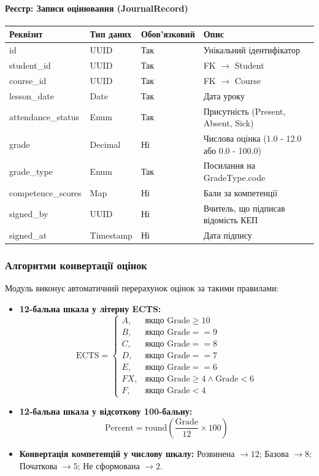 \documentclass{article}
\begin{document}
\paragraph{Реєстр: Записи оцінювання (JournalRecord)}
\begin{longtable}{p{3.5cm}p{3cm}p{2cm}p{5.5cm}}
\toprule
\textbf{Реквізит} & \textbf{Тип даних} & \textbf{Обов'язковий} & \textbf{Опис} \\
\midrule
id & UUID & Так & Унікальний ідентифікатор \\
student\_id & UUID & Так & FK $\rightarrow$ Student \\
course\_id & UUID & Так & FK $\rightarrow$ Course \\
lesson\_date & Date & Так & Дата уроку \\
attendance\_status & Enum & Так & Присутність (Present, Absent, Sick) \\
grade & Decimal & Ні & Числова оцінка (1.0 - 12.0 або 0.0 - 100.0) \\
grade\_type & Enum & Так & Посилання на GradeType.code \\
competence\_scores & Map & Ні & Бали за компетенції \\
signed\_by & UUID & Ні & Вчитель, що підписав відомість КЕП \\
signed\_at & Timestamp & Ні & Дата підпису \\
\bottomrule
\end{longtable}

\subsubsection{Алгоритми конвертації оцінок}
Модуль виконує автоматичний перерахунок оцінок за такими правилами:
\begin{itemize}
    \item \textbf{12-бальна шкала у літерну ECTS:}
    $$\text{ECTS} = \begin{cases} 
      A, & \text{якщо } \text{Grade} \ge 10 \\
      B, & \text{якщо } \text{Grade} == 9 \\
      C, & \text{якщо } \text{Grade} == 8 \\
      D, & \text{якщо } \text{Grade} == 7 \\
      E, & \text{якщо } \text{Grade} == 6 \\
      FX, & \text{якщо } \text{Grade} \ge 4 \land \text{Grade} < 6 \\
      F, & \text{якщо } \text{Grade} < 4 
   \end{cases}$$
    \item \textbf{12-бальна шкала у відсоткову 100-бальну:}
    $$\text{Percent} = \text{round}\left( \frac{\text{Grade}}{12} \times 100 \right)$$
    \item \textbf{Конвертація компетенцій у числову шкалу:}
    Розвинена $\rightarrow 12$; Базова $\rightarrow 8$; Початкова $\rightarrow 5$; Не сформована $\rightarrow 2$.
\end{itemize}
\end{document}
